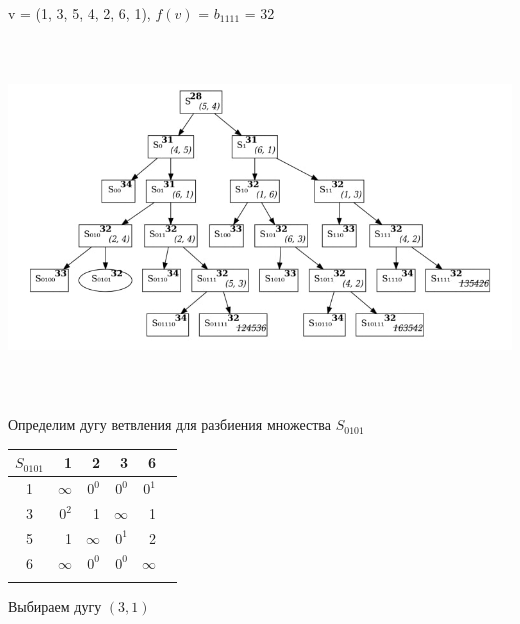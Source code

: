 \documentclass[12pt]{article}
\begin{document}
v = (1, 3, 5, 4, 2, 6, 1), $f(v)$ = $b_{1111}$  = 32\\
\begin{flushleft}
 
\includegraphics[width = 14cm, height = 9.5cm]{pictures/picture_03.jpg}\\
\end{flushleft}
\vspace{3cm}
\begin{flushleft}
 
Определим дугу ветвления для разбиения множества $S_{0101}$\\
\end{flushleft}

\begin{flushleft}
 \begin{tabular}{c||rrrr||c}
$S_{0101}$ & 1 &2 & 3  & 6 & \\
\hline
\hline
1 & $\infty$ & $0^0$ & $0^0$   & $0^1$ & \\
3 & $0^2$ & 1 & $\infty$   & 1 & \\
5 & 1 &  $\infty$ &  $0^1$ & 2 &\\
6 & $\infty$ & $0^0$ & $0^0$  & $\infty$ & \\
\hline
\hline
 & &   &  &   & \\
\end{tabular}
\end{flushleft}

Выбираем дугу $(3,1)$
\end{document}
